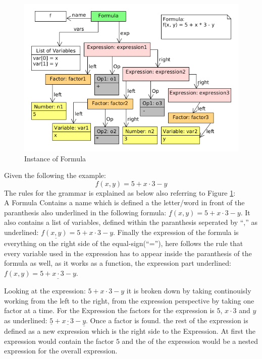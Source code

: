 \begin{figure}
  \begin{center}
    \includegraphics[width=\linewidth]{images/formulaInstance}
  \end{center}
  \caption{Instance of Formula}
  \label{fig:formulaInstance}
\end{figure}
    

Given the following the example: $$f(x, y) = 5 + x \cdot 3 - y$$
The rules for the grammar is explained as below also referring to Figure \ref{fig:formulaInstance}:
\\
A Formula Contains a name which is defined a the letter/word in front of the paranthesis
also underlined in the following formula: $\underline{f}(x, y) = 5 + x \cdot 3 - y$.
It also contains a list of variables, defined within the paranthesis seperated
by ``,'' as underlined: $f\underline{(x, y)} = 5 + x \cdot 3 - y$. Finally the expression
of the formula is everything on the right side of the equal-sign(``=''), here follows
the rule that every variable used in the expression has to appear inside the paranthesis
of the formula as well, as it works as a function, the expression part underlined:
$f(x, y) = \underline{5 + x \cdot 3 - y}$.

Looking at the expression: $5 + x \cdot 3 - y$ it is broken down by taking continouisly
working from the left to the right, from the expression perspective by taking one factor
at a time. For the Expression the factors for the expression is $5$, $x \cdot 3$ and $y$
as underlined: $\underline{5} + \underline{x \cdot 3} - \underline{y}$. Once a factor
is found. the rest of the expression is defined as a new expression which is the right
side to the Expression.
At first the expression would contain the factor $5$ and the of the expression would be
a nested expression for the overall expression.

